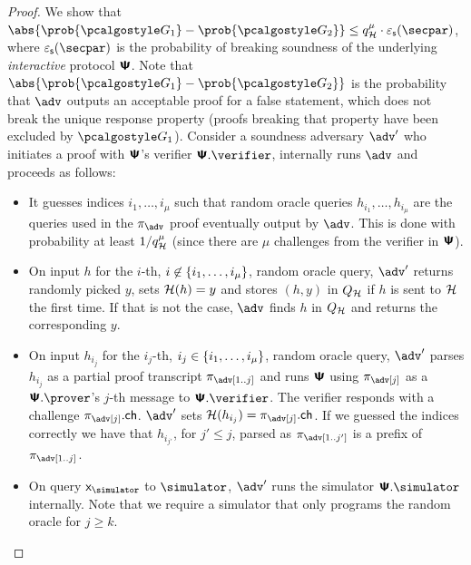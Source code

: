 \documentclass[runningheads,11pt]{llncs}
\begin{document}
\begin{proof}
  We show that
  $\abs{\prob{\game{1}} - \prob{\game{2}}} \leq q_{\ro}^{\mu} \cdot \epss(\secpar)$,
  where $\epss(\secpar)$ is the probability of breaking soundness of the underlying
  \emph{interactive} protocol $\bm{\mathsf{\Psi}}$. Note that
  $\abs{\prob{\game{1}} - \prob{\game{2}}}$ is the probability that $\adv$
  outputs an acceptable proof for a false statement, which does not break the
  unique response property (proofs breaking that property have been excluded by
  $\game{1}$). Consider a soundness adversary $\adv'$ who initiates a proof with
  $\bm{\mathsf{\Psi}}$'s verifier $\ps.\verifier$, internally runs $\adv$ and proceeds as
  follows:
  \begin{itemize}
  \item It guesses indices $i_1, \ldots, i_\mu$ such that random oracle queries
    $h_{i_1}, \ldots, h_{i_\mu}$ are the queries used in the $\zkproof_\adv$
    proof eventually output by $\adv$. This is done with probability at least
    $1/q_{\mathcal{H}}^\mu$ (since there are $\mu$ challenges from the verifier in
    $\bm{\mathsf{\Psi}}$).
  \item On input $h$ for the $i$-th,
    $i \not\in \{{i_1}, \ldots, {i_\mu}\}$, random oracle query, $\adv'$
    returns randomly picked $y$, sets $\mathcal{H}(h) = y $ and stores $(h, y)$ in
    $Q_{\mathcal{H}}$ if $h$ is sent to $\mathcal{H}$ the first time. If that is not the case,
    $\adv$ finds $h$ in $Q_{\mathcal{H}}$ and returns the corresponding $y$.
  \item On input $h_{i_j}$ for the $i_j$-th,
    $i_j \in \{{i_1}, \ldots, {i_\mu}\}$, random oracle query, $\adv'$
    parses $h_{i_j}$ as a partial proof transcript $\zkproof_\adv[1..j]$ and runs
    $\bm{\mathsf{\Psi}}$ using $\zkproof_\adv[j]$ as a $\ps.\prover$'s $j$-th message to
    $\ps.\verifier$. The verifier responds with a challenge
    $\zkproof_\adv[j].\ch$. $\adv'$ sets $\ro(h_{i_j}) = \zkproof_\adv[j].\ch$. If we guessed the indices correctly we have that $h_{i_{j'}}$, for $j' \leq j$, parsed as $\zkproof_\adv[1..j']$ is a prefix of $\zkproof_\adv[1..j]$.
  \item On query $\inp_\simulator$ to $\simulator$, $\adv'$ runs the simulator
    $\ps.\simulator$ internally. Note that we require a simulator that only programs the random oracle for $j \geq k$.


\end{itemize}
\end{proof}
\end{document}
